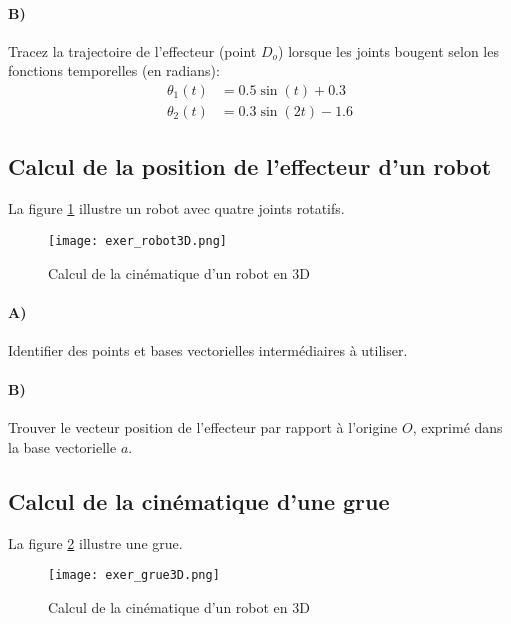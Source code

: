 \paragraph{B)}
Tracez la trajectoire de l'effecteur (point $D_o$) lorsque les joints bougent selon les fonctions temporelles (en radians):
\begin{align}
	\theta_1(t) &= 0.5 \sin(t) + 0.3 \\
	\theta_2(t) &= 0.3 \sin(2t) - 1.6
\end{align}




\subsection{Calcul de la position de l'effecteur d'un robot}

La figure \ref{fig:exer_robot3D} illustre un robot avec quatre joints rotatifs.
\begin{figure}[H]
	\centering
	\texttt{[image: exer\_robot3D.png]}
	\caption{Calcul de la cinématique d'un robot en 3D}
	\label{fig:exer_robot3D}
\end{figure}

\paragraph{A)}
Identifier des points et bases vectorielles intermédiaires à utiliser.

\paragraph{B)}
Trouver le vecteur position de l'effecteur par rapport à l'origine $O$, exprimé dans la base vectorielle $a$.


\subsection{Calcul de la cinématique d'une grue}

La figure \ref{fig:exer_grue3D} illustre une grue.
\begin{figure}[H]
	\centering
	\texttt{[image: exer\_grue3D.png]}
	\caption{Calcul de la cinématique d'un robot en 3D}
	\label{fig:exer_grue3D}
\end{figure}

